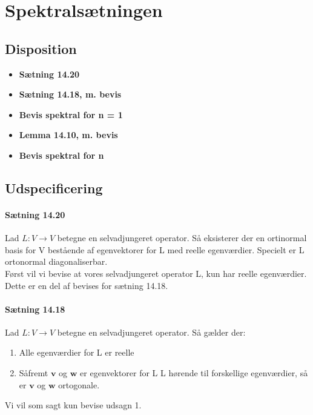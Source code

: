 \documentclass[paper=a4, fontsize=11pt]{scrartcl} %
\begin{document}
	
	\newpage
	
	\section{Spektralsætningen}
	
	\subsection{Disposition}
	
	\begin{itemize}
		\item \textbf{Sætning 14.20}
		\item \textbf{Sætning 14.18, m. bevis}
		\item \textbf{Bevis spektral for n = 1}
		\item \textbf{Lemma 14.10, m. bevis}
		\item \textbf{Bevis spektral for n}
	\end{itemize}
	
	\subsection{Udspecificering}
	
	
	\paragraph{Sætning 14.20} Lad $L:V\rightarrow V$ betegne en selvadjungeret operator. Så eksisterer der en ortinormal basis for V bestående af egenvektorer for L med reelle egenværdier. Specielt er L ortonormal diagonaliserbar.  \\ 
	
	Først vil vi bevise at vores selvadjungeret operator L, kun har reelle egenværdier. Dette er en del af bevises for sætning 14.18.
	
	\paragraph{Sætning 14.18} Lad $L:V\rightarrow V$ betegne en selvadjungeret operator. Så gælder der:
	\begin{enumerate}
		\item Alle egenværdier for L er reelle
		\item Såfremt $\mathbf{v}$ og $\mathbf{w}$ er egenvektorer for L L hørende til forskellige egenværdier, så er $\mathbf{v}$ og $\mathbf{w}$ ortogonale.
	\end{enumerate}
	Vi vil som sagt kun bevise udsagn 1.
	
\end{document}
